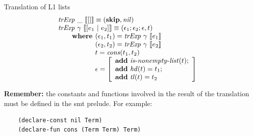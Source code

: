 \documentclass{beamer}
\begin{document}
  \begin{frame}[fragile]{Translation of L1 lists}
    \[
      \begin{array}{l}
      \trExp{\_}{[]} \equiv (
        \skipE, \mathit{nil}
      )\\
      \trExp{\gamma}{[e_1~|~e_2]} \equiv (\epsilon_1;\epsilon_2;\epsilon, t)\\
        \qquad \textbf{where } (\epsilon_1, t_1) = \trExp{\gamma}{e_1}\\ 
        \qquad \phantom{\textbf{where }} (\epsilon_2, t_2) = \trExp{\gamma}{e_2}\\ 
        \qquad \phantom{\textbf{where }} t = \mathit{cons}(t_1, t_2)\\ 
        \qquad \phantom{\textbf{where }} \epsilon = \left[
          \begin{array}{l}
            \addE~\isnelist{t};\\
            \addE~\mathit{hd}(t) = t_1;\\
            \addE~\mathit{tl}(t) = t_2\\
          \end{array}
        \right]
      \end{array}
    \]

    \medskip \pause

    \textbf{Remember:} the constants and functions involved in the result of the translation 
    must be defined in the \acrshort*{smt} prelude. For example:
    \begin{verbatim}
    (declare-const nil Term)
    (declare-fun cons (Term Term) Term)
    \end{verbatim}
  \end{frame}
\end{document}
